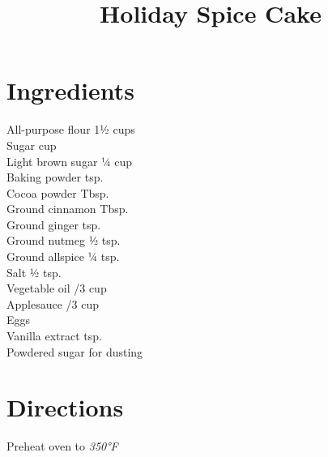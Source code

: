 \documentclass[11pt,letterpaper]{article}
\title{Holiday Spice Cake}
\author{}
\date{}
\begin{document}
\maketitle
\thispagestyle{empty}

\section*{Ingredients}
\setlength{\columnsep}{20pt}
\begin{multicols}{2}
\noindent
    All-purpose flour \dotfill 1½ cups \\
    Sugar  cup \\
    Light brown sugar \dotfill ¼ cup \\
    Baking powder  tsp. \\
    Cocoa powder  Tbsp. \\
    Ground cinnamon  Tbsp. \\
    Ground ginger  tsp. \\
    Ground nutmeg \dotfill ½ tsp. \\
    Ground allspice \dotfill ¼ tsp. \\
    \columnbreak
    Salt \dotfill ½ tsp. \\
    Vegetable oil /3 cup \\
    Applesauce /3 cup \\
    Eggs  \\
    Vanilla extract  tsp. \\
    Powdered sugar \dotfill for dusting \\
\end{multicols}

\section*{Directions}

\noindent
Preheat oven to \textit{350°F}
\end{document}
